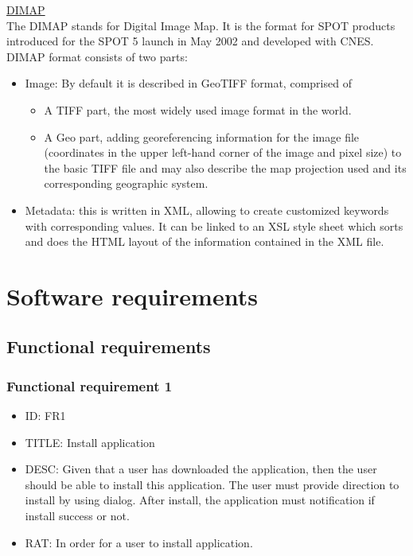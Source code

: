 \documentclass[11pt]{article}
\begin{document}
\noindent \underline{DIMAP}\\
The DIMAP stands for Digital Image Map. It is the format for SPOT products introduced for the SPOT 5 launch in May 2002 and developed with CNES.\footnotemark \\
DIMAP format consists of two parts:\footnotemark[\value{footnote}]
\begin{itemize}
\item Image: By default it is described in GeoTIFF format, comprised of
\begin{itemize}
\item A TIFF part, the most widely used image format in the world.
\item A Geo part, adding georeferencing information for the image file (coordinates in the upper left-hand corner of the image and pixel size) to the basic TIFF file and may also describe the map projection used and its corresponding geographic system.
\end{itemize}
\item Metadata: this is written in XML, allowing to create customized keywords with corresponding values. It can be linked to an XSL style sheet which sorts and does the HTML layout of the information contained in the XML file.
\end{itemize}

\section{Software requirements}
\subsection{Functional requirements}
\subsubsection{Functional requirement 1}
\begin{itemize}
\item ID: FR1
\item TITLE: Install application
\item DESC: Given that a user has downloaded the application, then the user should be able to install this application. The user must provide direction to install by using dialog. After install, the application must notification if install success or not.
\item RAT: In order for a user to install application.
\end{itemize}
\end{document}
